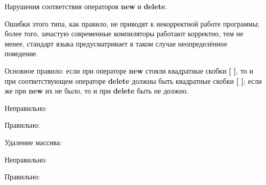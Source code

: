 \begin{typerror}
	Нарушения соответствия операторов \textbf{new} и \textbf{delete}.

	Ошибки этого типа, как правило, не приводят к некорректной работе программы;
	более того, зачастую современные компиляторы работают корректно, тем не менее, стандарт языка предусматривает в таком случае неопределённое поведение.

	Основное правило:
	если при операторе \textbf{new} стояли квадратные скобки \textbf{[ ]}, то и при соответствующем операторе \textbf{delete} должны быть квадратные скобки \textbf{[ ]};
	если же при \textbf{new} их не было, то и при \textbf{delete} быть не должно.

	Неправильно:

	Правильно:

	Удаление массива:

	Неправильно:

	Правильно:
	
\end{typerror}
